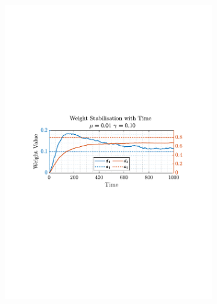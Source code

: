 \documentclass[12pt]{article}
\begin{document}
\begin{figure}[H]
\begin{subfigure}{0.49\textwidth}
					\includegraphics[trim={2.2cm 11.2cm 3.00cm  11.2cm}, clip, width=\textwidth]{../MATLAB/figures/q2_1f_fig02.pdf} 
					\captionsetup{justification=centering}
				\end{subfigure}
			

\end{figure}
\end{document}
